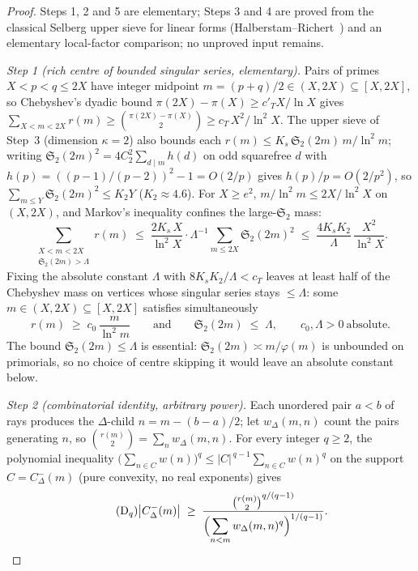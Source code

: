 \documentclass[11pt]{article}
\theoremstyle{plain}
\theoremstyle{definition}
\newcommand{\rch}{r}
\begin{document}
\begin{proof}
Steps 1, 2 and 5 are elementary; Steps 3 and 4 are proved from
the classical Selberg upper sieve for linear forms
(Halberstam--Richert~\cite[Theorem~5.7]{hr}) and an elementary
local-factor comparison; no unproved input remains.

\smallskip
\noindent\emph{Step 1 (rich centre of bounded singular series,
elementary).} Pairs of primes $X < p < q \le 2X$ have integer midpoint
$m = (p + q)/2 \in (X, 2X) \subseteq [X, 2X]$, so Chebyshev's
dyadic bound $\pi(2X) - \pi(X) \ge c'_T X/\ln X$ gives
$\sum_{X < m < 2X} \rch(m) \ge \binom{\pi(2X)-\pi(X)}{2}
\ge c_T\, X^{2}/\ln^{2} X$.
The upper sieve of Step~3 (dimension $\kappa = 2$) also bounds each
$\rch(m) \le K_s\,\mathfrak{S}_2(2m)\,m/\ln^{2} m$;
writing $\mathfrak{S}_2(2m)^{2} = 4C_2^{2}\sum_{d \mid m} h(d)$
on odd squarefree $d$ with
$h(p) = ((p-1)/(p-2))^{2} - 1 = O(2/p)$ gives
$h(p)/p = O(2/p^{2})$, so
$\sum_{m \le Y} \mathfrak{S}_2(2m)^{2} \le K_2 Y$
($K_2 \approx 4.6$). For $X \ge e^{2}$,
$m/\ln^{2} m \le 2X/\ln^{2} X$ on $(X, 2X)$, and Markov's
inequality confines the large-$\mathfrak{S}_2$ mass:
\[
\sum_{\substack{X < m < 2X \\ \mathfrak{S}_2(2m) > \Lambda}}
\rch(m)
\;\le\; \frac{2 K_s\, X}{\ln^{2} X}\cdot \Lambda^{-1}
 \sum_{m \le 2X} \mathfrak{S}_2(2m)^{2}
\;\le\; \frac{4 K_s K_2}{\Lambda}\,
 \frac{X^{2}}{\ln^{2} X} .
\]
Fixing the absolute constant $\Lambda$ with
$8 K_s K_2 / \Lambda < c_T$ leaves at least half of the
Chebyshev mass on vertices whose singular series stays
$\le \Lambda$: some $m \in (X, 2X) \subseteq [X, 2X]$ satisfies
simultaneously
\[
\rch(m) \;\ge\; c_0\, \frac{m}{\ln^{2} m}
\qquad\text{and}\qquad
\mathfrak{S}_2(2m) \;\le\; \Lambda ,
\qquad c_0, \Lambda > 0 \ \text{absolute}.
\]
The bound $\mathfrak{S}_2(2m) \le \Lambda$ is essential:
$\mathfrak{S}_2(2m) \asymp m/\varphi(m)$ is unbounded on
primorials, so no choice of centre skipping it would leave an
absolute constant below.

\smallskip
\noindent\emph{Step 2 (combinatorial identity, arbitrary power).}
Each unordered pair $a < b$ of rays produces the $\Delta$-child
$n = m - (b-a)/2$; let $w_\Delta(m,n)$ count the pairs generating
$n$, so $\binom{\rch(m)}{2} = \sum_n w_\Delta(m,n)$. For every
integer $q \ge 2$, the polynomial inequality
$\bigl(\sum_{n \in C} w(n)\bigr)^{q} \le |C|^{\,q-1}
\sum_{n \in C} w(n)^{q}$ on the support $C = C_\Delta^{-}(m)$
(pure convexity, no real exponents) gives
\begin{equation}\label{eq:D1q}\tag{D$_q$}
\bigl|C_\Delta^{-}(m)\bigr|
 \;\ge\; \frac{\binom{\rch(m)}{2}^{q/(q-1)}}
 {\displaystyle\Bigl(\sum_{n < m} w_\Delta(m,n)^{q}\Bigr)^{1/(q-1)}} .
\end{equation}


\end{proof}
\end{document}
